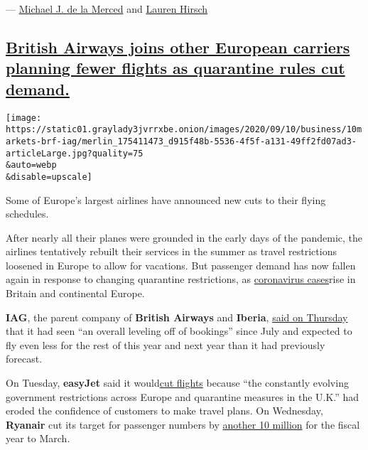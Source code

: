 ---
\href{https://www.nytimes3xbfgragh.onion/by/michael-j-de-la-merced}{Michael
J. de la Merced} and
\href{https://www.nytimes3xbfgragh.onion/by/lauren-hirsch}{Lauren
Hirsch}

\hypertarget{british-airways-joins-other-european-carriers-planning-fewer-flights-as-quarantine-rules-cut-demand}{%
\subsection{\texorpdfstring{\protect\hyperlink{british-airways-joins-other-european-carriers-planning-fewer-flights-as-quarantine-rules-cut-demand}{British
Airways joins other European carriers planning fewer flights as
quarantine rules cut
demand.}}{British Airways joins other European carriers planning fewer flights as quarantine rules cut demand.}}\label{british-airways-joins-other-european-carriers-planning-fewer-flights-as-quarantine-rules-cut-demand}}

\texttt{[image: https://static01.graylady3jvrrxbe.onion/images/2020/09/10/business/10markets-brf-iag/merlin\_175411473\_d915f48b-5536-4f5f-a131-49ff2fd07ad3-articleLarge.jpg?quality=75\\\&auto=webp\\\&disable=upscale]}

Some of Europe's largest airlines have announced new cuts to their
flying schedules.

After nearly all their planes were grounded in the early days of the
pandemic, the airlines tentatively rebuilt their services in the summer
as travel restrictions loosened in Europe to allow for vacations. But
passenger demand has now fallen again in response to changing quarantine
restrictions, as
\href{https://www.nytimes3xbfgragh.onion/2020/08/21/world/europe/coronavirus-second-wave.html}{coronavirus
cases}rise in Britain and continental Europe.

\textbf{IAG}, the parent company of \textbf{British Airways} and
\textbf{Iberia},
\href{https://www.iairgroup.com/~/media/Files/I/IAG/press-releases/english/2020/Fully\%20Underwritten\%20Capital\%20Increase\%20to\%20Raise\%20Gross\%20Proceeds\%20of\%202741\%20million.pdf}{said
on Thursday} that it had seen ``an overall leveling off of bookings''
since July and expected to fly even less for the rest of this year and
next year than it had previously forecast.

On Tuesday, \textbf{easyJet} said it
would\href{https://www.londonstockexchange.com/news-article/EZJ/capacity-update/14678136}{cut
flights} because ``the constantly evolving government restrictions
across Europe and quarantine measures in the U.K.'' had eroded the
confidence of customers to make travel plans. On Wednesday,
\textbf{Ryanair} cut its target for passenger numbers by
\href{https://www.reuters.com/article/us-health-coronavirus-ryanair/ryanair-steels-for-winter-write-off-as-travel-gloom-deepens-idUSKBN2601RA}{another
10 million} for the fiscal year to March.

